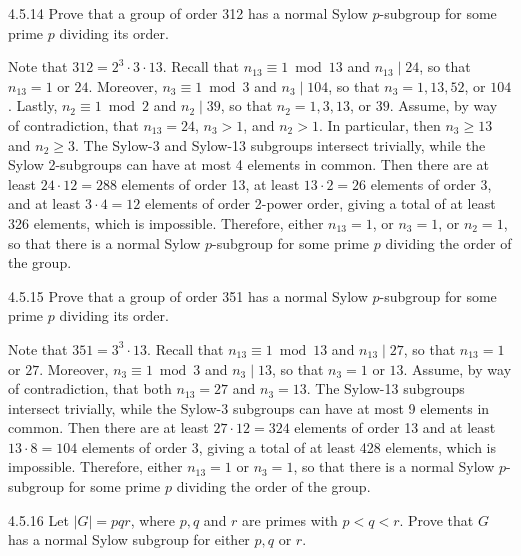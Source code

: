 \begin{exercise}{4.5.14}
	Prove that a group of order 312 has a normal Sylow $p$-subgroup for some prime $p$ dividing its order.
\end{exercise}

\begin{sol}
	Note that $312 = 2^3 \cdot 3 \cdot 13$.
	Recall that $n_{13} \equiv 1 \bmod 13$ and $n_{13} \mid 24$, so that $n_{13} = 1$ or $24$.
	Moreover, $n_3 \equiv 1 \bmod 3$ and $n_3 \mid 104$, so that $n_3 = 1, 13, 52$, or $104$.
	Lastly, $n_2 \equiv 1 \bmod 2$ and $n_2 \mid 39$, so that $n_2 = 1, 3, 13$, or $39$.
	Assume, by way of contradiction, that $n_{13} = 24$, $n_3 > 1$, and $n_2 > 1$.
	In particular, then $n_3 \geq 13$ and $n_2 \geq 3$.
	The Sylow-3 and Sylow-13 subgroups intersect trivially, while the Sylow 2-subgroups can have at most 4 elements in common.
	Then there are at least $24 \cdot 12 = 288$ elements of order 13, at least $13 \cdot 2 = 26$ elements of order 3, and at least $3 \cdot 4 = 12$ elements of order 2-power order, giving a total of at least 326 elements, which is impossible.
	Therefore, either $n_{13} = 1$, or $n_3 = 1$, or $n_2 = 1$, so that there is a normal Sylow $p$-subgroup for some prime $p$ dividing the order of the group.
\end{sol}

\begin{exercise}{4.5.15}
	Prove that a group of order 351 has a normal Sylow $p$-subgroup for some prime $p$ dividing its order.
\end{exercise}

\begin{sol}
	Note that $351 = 3^3 \cdot 13$.
	Recall that $n_{13} \equiv 1 \bmod 13$ and $n_{13} \mid 27$, so that $n_{13} = 1$ or $27$.
	Moreover, $n_3 \equiv 1 \bmod 3$ and $n_3 \mid 13$, so that $n_3 = 1$ or $13$.
	Assume, by way of contradiction, that both $n_{13} = 27$ and $n_3 = 13$.
	The Sylow-13 subgroups intersect trivially, while the Sylow-3 subgroups can have at most 9 elements in common.
	Then there are at least $27 \cdot 12 = 324$ elements of order 13 and at least $13 \cdot 8 = 104$ elements of order 3, giving a total of at least 428 elements, which is impossible.
	Therefore, either $n_{13} = 1$ or $n_3 = 1$, so that there is a normal Sylow $p$-subgroup for some prime $p$ dividing the order of the group.
\end{sol}

\begin{exercise}{4.5.16}
	Let $|G| = pqr$, where $p, q$ and $r$ are primes with $p < q < r$.
	Prove that $G$ has a normal Sylow subgroup for either $p, q$ or $r$.
\end{exercise}

